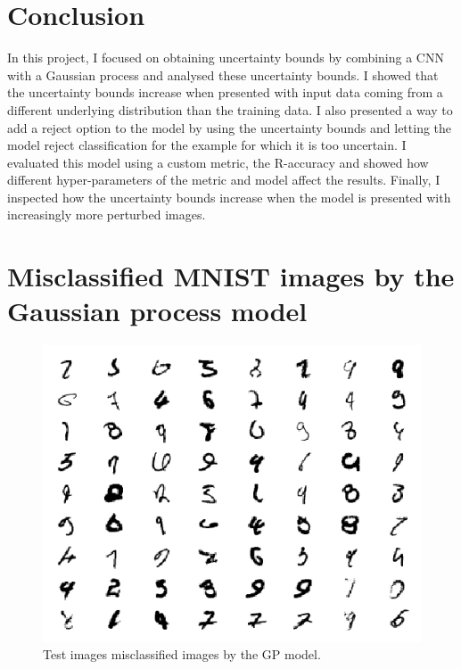\documentclass{article}
\begin{document}
\section{Conclusion}
In this project, I focused on obtaining uncertainty bounds by combining a CNN with a Gaussian process and analysed these uncertainty bounds. I showed that the uncertainty bounds increase when presented with input data coming from a different underlying distribution than the training data. I also presented a way to add a reject option to the model by using the uncertainty bounds and letting the model reject classification for the example for which it is too uncertain. I evaluated this model using a custom metric, the R-accuracy and showed how different hyper-parameters of the metric and model affect the results. Finally, I inspected how the uncertainty bounds increase when the model is presented with increasingly more perturbed images.

\small




\newpage
\appendix 
\section{Misclassified MNIST images by the Gaussian process model}
\label{appendix/mnist_error}

\begin{figure}[h]
	\centering
	\includegraphics[scale=1.1]{incorrect_mnist}
	\caption{Test images misclassified images by the GP model.}
	\label{fig/incorrect_mnist}
\end{figure}
\end{document}
